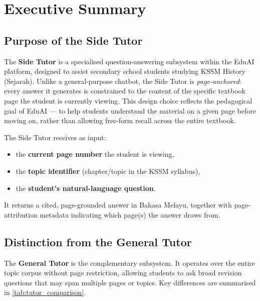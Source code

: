\documentclass[12pt, a4paper]{report}
\begin{document}
\setcounter{page}{2}

\tableofcontents
\clearpage

\listoftables
\clearpage

\setcounter{page}{1}


\chapter{Executive Summary}

\section{Purpose of the Side Tutor}

The \textbf{Side Tutor} is a specialised question-answering subsystem within the
EduAI platform, designed to assist secondary school students studying KSSM
History (Sejarah). Unlike a general-purpose chatbot, the Side Tutor is
\emph{page-anchored}: every answer it generates is constrained to the content of
the specific textbook page the student is currently viewing. This design choice
reflects the pedagogical goal of EduAI — to help students understand the material
on a given page before moving on, rather than allowing free-form recall across
the entire textbook.

The Side Tutor receives as input:
\begin{itemize}[noitemsep]
  \item the \textbf{current page number} the student is viewing,
  \item the \textbf{topic identifier} (chapter/topic in the KSSM syllabus),
  \item the \textbf{student's natural-language question}.
\end{itemize}

It returns a cited, page-grounded answer in Bahasa Melayu, together with
page-attribution metadata indicating which page(s) the answer draws from.

\section{Distinction from the General Tutor}

The \textbf{General Tutor} is the complementary subsystem. It operates over the
entire topic corpus without page restriction, allowing students to ask broad
revision questions that may span multiple pages or topics. Key differences are
summarised in \cref{tab:tutor_comparison}.
\end{document}
